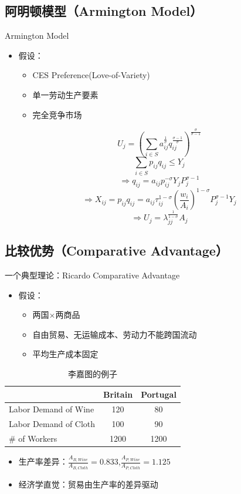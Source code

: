 \documentclass{beamer}
\begin{document}
\subsection{阿明顿模型（Armington Model）}
\begin{frame}{Armington Model}
\begin{itemize}
    \item 假设：
    \begin{itemize}
        \item CES Preference(Love-of-Variety)
        \item 单一劳动生产要素
        \item 完全竞争市场
    \end{itemize}
\[U_{j}=\left(\sum_{i\in S}a_{ij}^{\frac{1}{\sigma}}q_{ij}^{\frac{\sigma-1}{\sigma}}\right)^{\frac{\sigma}{\sigma-1}}\]
\[\sum_{i\in S}p_{ij}q_{ij}\leq Y_{j}\]
\[\Longrightarrow q_{ij}=a_{ij}p_{ij}^{-\sigma}Y_{j}P_{j}^{\sigma-1}\]
\[\Longrightarrow X_{ij}=p_{ij}q_{ij}=a_{ij}\tau_{ij}^{1-\sigma}\left(\frac{w_{i}}{A_{i}}\right)^{1-\sigma}P_{j}^{\sigma-1}Y_{j}\]
\[\Longrightarrow U_j=\lambda_{jj}^\frac{1}{1-\sigma}A_j\]
\end{itemize}
\end{frame}


\subsection{比较优势（Comparative Advantage）}
\begin{frame}{一个典型理论：Ricardo Comparative Advantage}
\begin{itemize}
    \item 假设：
    \begin{itemize}
        \item 两国\(\times\)两商品
        \item 自由贸易、无运输成本、劳动力不能跨国流动
        \item 平均生产成本固定
    \end{itemize}
\end{itemize}
\begin{table}[htbp]
  \centering
  \caption{李嘉图的例子}
  \begin{tabular}{lcc}
    \hline
     & Britain & Portugal \\
    \hline
    \quad Labor Demand of Wine & 120 & 80 \\
    \quad Labor Demand of Cloth & 100 & 90 \\
    \hline
    \# of Workers & 1200 & 1200 \\
    \hline
  \end{tabular}
\end{table}
\begin{itemize}
    \item 生产率差异：\(\frac{A_{B,Wine}}{A_{B,Cloth}}=0.833\),\(\frac{A_{P,Wine}}{A_{P,Cloth}}=1.125\)
    \item 经济学直觉：贸易由生产率的差异驱动
\end{itemize}
\end{frame}
\end{document}
